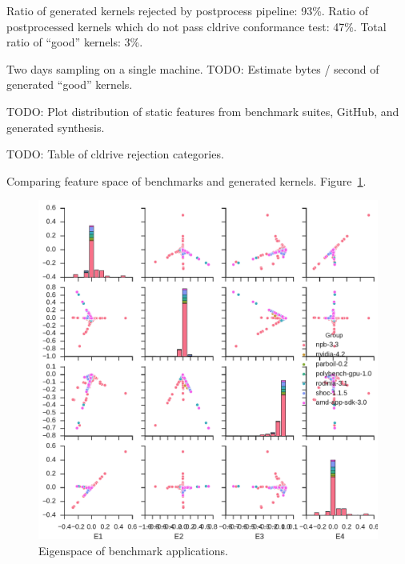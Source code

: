 \documentclass[preprint,nonatbib,10pt,nocopyrightspace]{sigplanconf}
\begin{document}
Ratio of generated kernels rejected by postprocess pipeline:
93\%. Ratio of postprocessed kernels which do not pass cldrive
conformance test:
47\%. Total ratio of ``good'' kernels: 3\%.

Two days sampling on a single machine. TODO: Estimate bytes / second
of generated ``good'' kernels.

TODO: Plot distribution of static features from benchmark suites,
GitHub, and generated synthesis.

TODO: Table of cldrive rejection categories.

Comparing feature space of benchmarks and generated
kernels. Figure~\ref{fig:bench-eigens}.

\begin{figure}%
  \includegraphics[width=\columnwidth]{img/bench-eigens}%
  \caption{%
    Eigenspace of benchmark applications.%
  }
  \label{fig:bench-eigens}
\end{figure}
\end{document}
